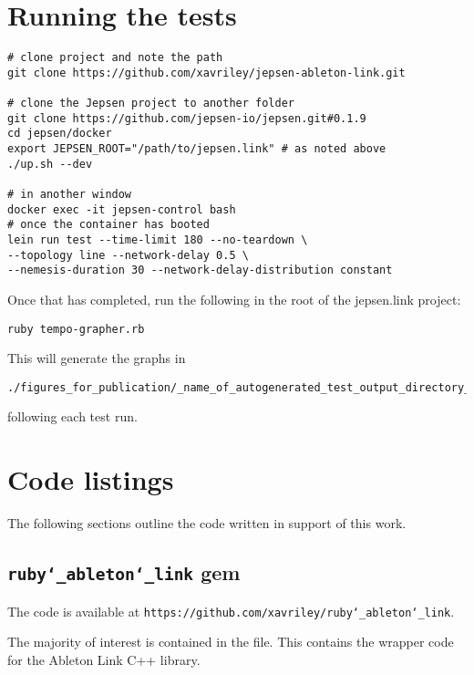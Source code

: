 \documentclass[11pt]{article} %
\theoremstyle{plain}
\theoremstyle{definition}
\begin{document}
\section{Running the tests}

\begin{verbatim}
# clone project and note the path
git clone https://github.com/xavriley/jepsen-ableton-link.git

# clone the Jepsen project to another folder
git clone https://github.com/jepsen-io/jepsen.git#0.1.9
cd jepsen/docker
export JEPSEN_ROOT="/path/to/jepsen.link" # as noted above
./up.sh --dev

# in another window
docker exec -it jepsen-control bash
# once the container has booted
lein run test --time-limit 180 --no-teardown \
--topology line --network-delay 0.5 \
--nemesis-duration 30 --network-delay-distribution constant
\end{verbatim}

Once that has completed, run the following in the root of the jepsen.link
project:

\begin{verbatim}
ruby tempo-grapher.rb
\end{verbatim}

This will generate the graphs in

\begin{verbatim}
./figures_for_publication/_name_of_autogenerated_test_output_directory_/plot.pdf
\end{verbatim}

following each test run.

\section{Code listings}

The following sections outline the code written in support of this work.

\subsection{\texttt{ruby\char`_ableton\char`_link} gem}

The code is available at
\texttt{https://github.com/xavriley/ruby\char`_ableton\char`_link}.

The majority of interest is contained in the
\texttt{} file. This contains the
wrapper code for the Ableton Link C++ library.
\end{document}
